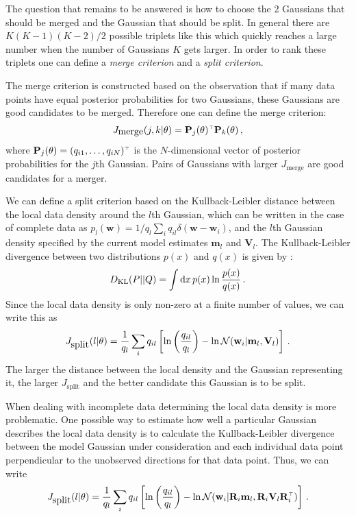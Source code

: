 \documentclass[aoas,preprint,authoryear,round]{imsart}
\newcommand{\dd}{\mathrm{d}}
\newcommand{\normal}{{\cal N}}
\renewcommand{\vec}[1]{\mathbf{#1}} %
\newcommand{\mm}{\vec{m}}
\newcommand{\ww}{\vec{w}}
\newcommand{\wwi}{\ww_i}
\newcommand{\ten}[1]{\mathbf{#1}} %
\newcommand{\RR}{\ten{R}}
\newcommand{\VV}{\ten{V}}
\newcommand{\PP}{\mbox{\bf P}}
\newcommand{\RRi}{\RR_i}
\newcommand{\T}{^{\scriptscriptstyle \top}}   %
\begin{document}
The question that remains to be answered is how to choose the 2
Gaussians that should be merged and the Gaussian that should be
split. In general there are $K(K-1)(K-2)/2$ possible triplets like
this which quickly reaches a large number when the number of Gaussians
$K$ gets larger. In order to rank these triplets one can define a
\emph{merge criterion} and a \emph{split criterion}.

The merge criterion is constructed based on the observation that if
many data points have equal posterior probabilities for two Gaussians,
these Gaussians are good candidates to be merged. Therefore one can
define the merge criterion:
\begin{equation}
J_{\mbox{merge}}(j,k|\theta) = \PP_j(\theta)\T \PP_k(\theta)\, ,
\end{equation}
where $\PP_j(\theta)=(q_{i1},\ldots,q_{iN})\T$ is the $N$-dimensional
vector of posterior probabilities for the $j$th Gaussian. Pairs of
Gaussians with larger $J_{\mbox{merge}}$ are good candidates for a
merger.

We can define a split criterion based on the Kullback-Leibler distance
between the local data density around the $l$th Gaussian, which can be
written in the case of complete data as $p_l(\ww) = 1/q_l\sum_i
q_{il}\delta(\ww-\wwi)$, and the $l$th Gaussian density specified by
the current model estimates $\mm_l$ and $\VV_l$. The Kullback-Leibler
divergence between two distributions $p(x)$ and $q(x)$ is given by
\citep{Mackay2003}:
\begin{equation}
D_{\textnormal{KL}}(P||Q) = \int\dd x\,p(x)\ln\frac{p(x)}{q(x)}\, .
\end{equation}
Since the local data density is only non-zero at a finite number of
values, we can write this as
\begin{equation}
J_{\mbox{split}}(l|\theta) = \frac{1}{q_l}\sum_i q_{il}
\left[\ln\left( \frac{q_{il}}{q_l}\right) - \ln
\normal(\wwi|\mm_l,\VV_l)\right]\, .
\end{equation}
The larger the distance between the local density and the Gaussian
representing it, the larger $J_{\mbox{split}}$ and the better
candidate this Gaussian is to be split.

When dealing with incomplete data determining the local data density
is more problematic. One possible way to estimate how well a
particular Gaussian describes the local data density is to calculate
the Kullback-Leibler divergence between the model Gaussian under
consideration and each individual data point perpendicular to the
unobserved directions for that data point. Thus, we can write
\begin{equation}
J_{\mbox{split}}(l|\theta) = \frac{1}{q_l}\sum_i q_{il}
\left[\ln\left( \frac{q_{il}}{q_l}\right) - \ln
\normal(\wwi|\RRi\mm_l,\RRi\VV_l\RRi\T)\right]\, .
\end{equation}
\end{document}
